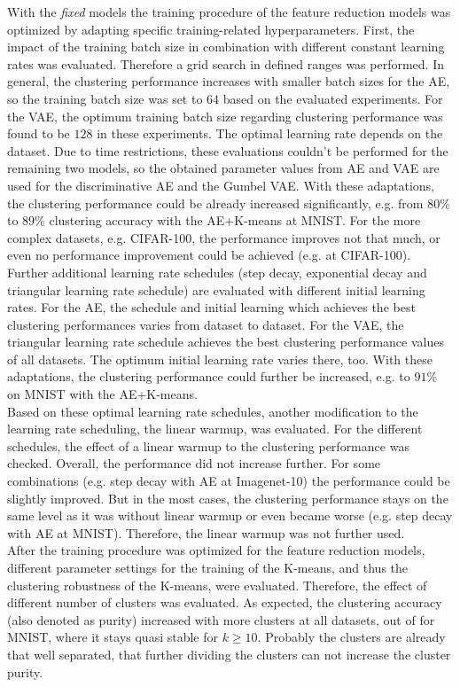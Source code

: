 \documentclass[12pt,DIV14,BCOR12mm,a4paper,footexclude,headinclude,halfparskip-,twoside,openright,cleardoubleempty,idxtotoc,bibtotoc,listtotoc,abstracton]{scrreprt} %
\numberwithin{equation}{chapter}
\begin{document}
With the \textit{fixed} models the training procedure of the feature reduction models was optimized by adapting specific training-related hyperparameters. First, the impact of the training batch size in combination with different constant learning rates was evaluated. Therefore a grid search in defined ranges was performed. In general, the clustering performance increases with smaller batch sizes for the AE, so the training batch size was set to $64$ based on the evaluated experiments. For the VAE, the optimum training batch size regarding clustering performance was found to be $128$ in these experiments. The optimal learning rate depends on the dataset. Due to time restrictions, these evaluations couldn't be performed for the remaining two models, so the obtained parameter values from AE and VAE are used for the discriminative AE and the Gumbel VAE. With these adaptations, the clustering performance could be already increased significantly, e.g. from $80\%$ to $89\%$ clustering accuracy with the AE+K-means at MNIST. For the more complex datasets, e.g. CIFAR-100, the performance improves not that much, or even no performance improvement could be achieved (e.g. at CIFAR-100).\\
Further additional learning rate schedules (step decay, exponential decay and triangular learning rate schedule) are evaluated with different initial learning rates. For the AE, the schedule and initial learning which achieves the best clustering performances varies from dataset to dataset. For the VAE, the triangular learning rate schedule achieves the best clustering performance values of all datasets. The optimum initial learning rate varies there, too. With these adaptations, the clustering performance could further be increased, e.g. to $91\%$ on MNIST with the AE+K-means.\\
Based on these optimal learning rate schedules, another modification to the learning rate scheduling, the linear warmup, was evaluated. For the different schedules, the effect of a linear warmup to the clustering performance was checked. Overall, the performance did not increase further. For some combinations (e.g. step decay with AE at Imagenet-10) the performance could be slightly improved. But in the most cases, the clustering performance stays on the same level as it was without linear warmup or even became worse (e.g. step decay with AE at MNIST). Therefore, the linear warmup was not further used.\\
After the training procedure was optimized for the feature reduction models, different parameter settings for the training of the K-means, and thus the clustering robustness of the K-means, were evaluated. Therefore, the effect of different number of clusters was evaluated. As expected, the clustering accuracy (also denoted as purity) increased with more clusters at all datasets, out of for MNIST, where it stays quasi stable for $k\geq10$. Probably the clusters are already that well separated, that further dividing the clusters can not increase the cluster purity.\\
\end{document}
